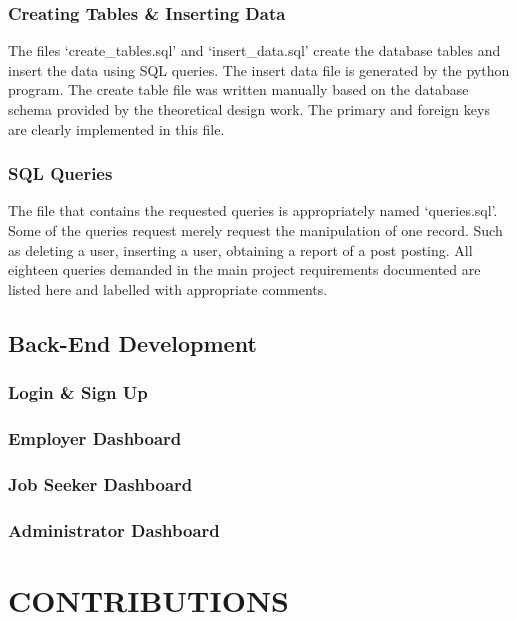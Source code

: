\documentclass[11pt]{article}
\begin{document}
\subsubsection{Creating Tables \& Inserting Data}
The files `create\_tables.sql' and `insert\_data.sql' create the database tables and insert the data using SQL queries. The insert data file is generated by the python program. The create table file was written manually based on the database schema provided by the theoretical design work. The primary and foreign keys are clearly implemented in this file.


\subsubsection{SQL Queries}

The file that contains the requested queries is appropriately named `queries.sql'. Some of the queries request merely request the manipulation of one record. Such as deleting a user, inserting a user, obtaining a report of a post posting. All eighteen queries demanded in the main project requirements documented are listed here and labelled with appropriate comments. 


\subsection{Back-End Development}


\subsubsection{Login \& Sign Up}

\subsubsection{Employer Dashboard}

\subsubsection{Job Seeker Dashboard}

\subsubsection{Administrator Dashboard}

\section{CONTRIBUTIONS}
\end{document}
